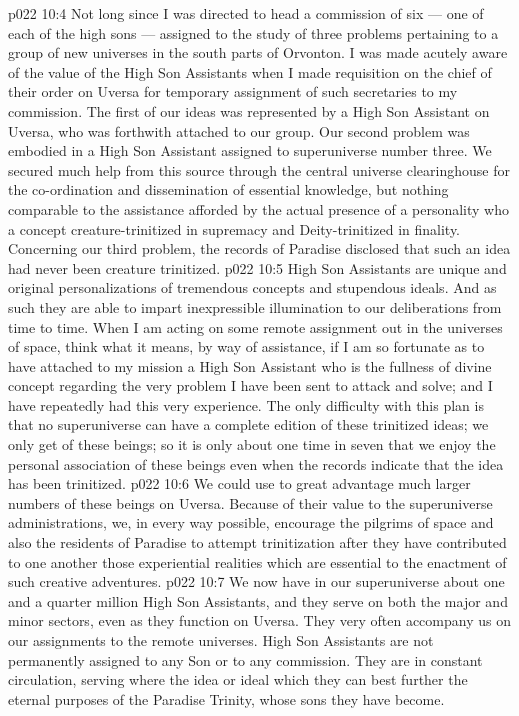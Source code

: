 \vs p022 10:4 \pc Not long since I was directed to head a commission of six --- one of each of the high sons --- assigned to the study of three problems pertaining to a group of new universes in the south parts of Orvonton. I was made acutely aware of the value of the High Son Assistants when I made requisition on the chief of their order on Uversa for temporary assignment of such secretaries to my commission. The first of our ideas was represented by a High Son Assistant on Uversa, who was forthwith attached to our group. Our second problem was embodied in a High Son Assistant assigned to superuniverse number three. We secured much help from this source through the central universe clearinghouse for the co\hyp{}ordination and dissemination of essential knowledge, but nothing comparable to the assistance afforded by the actual presence of a personality who  a concept creature\hyp{}trinitized in supremacy and Deity\hyp{}trinitized in finality. Concerning our third problem, the records of Paradise disclosed that such an idea had never been creature trinitized.
\vs p022 10:5 \pc High Son Assistants are unique and original personalizations of tremendous concepts and stupendous ideals. And as such they are able to impart inexpressible illumination to our deliberations from time to time. When I am acting on some remote assignment out in the universes of space, think what it means, by way of assistance, if I am so fortunate as to have attached to my mission a High Son Assistant who is the fullness of divine concept regarding the very problem I have been sent to attack and solve; and I have repeatedly had this very experience. The only difficulty with this plan is that no superuniverse can have a complete edition of these trinitized ideas; we only get  of these beings; so it is only about one time in seven that we enjoy the personal association of these beings even when the records indicate that the idea has been trinitized.
\vs p022 10:6 We could use to great advantage much larger numbers of these beings on Uversa. Because of their value to the superuniverse administrations, we, in every way possible, encourage the pilgrims of space and also the residents of Paradise to attempt trinitization after they have contributed to one another those experiential realities which are essential to the enactment of such creative adventures.
\vs p022 10:7 \pc We now have in our superuniverse about one and a quarter million High Son Assistants, and they serve on both the major and minor sectors, even as they function on Uversa. They very often accompany us on our assignments to the remote universes. High Son Assistants are not permanently assigned to any Son or to any commission. They are in constant circulation, serving where the idea or ideal which they  can best further the eternal purposes of the Paradise Trinity, whose sons they have become.
